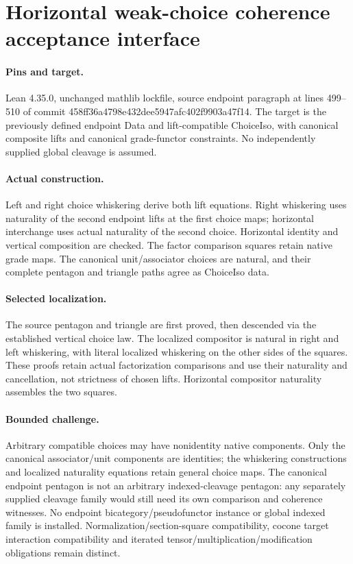 \documentclass{article}
\begin{document}
\section*{Horizontal weak-choice coherence acceptance interface}
\paragraph{Pins and target.} Lean 4.35.0, unchanged mathlib lockfile, source endpoint paragraph at lines 499--510 of commit 458ff36a4798e432dee5947afc402f9903a47f14. The target is the previously defined endpoint Data and lift-compatible ChoiceIso, with canonical composite lifts and canonical grade-functor constraints. No independently supplied global cleavage is assumed.
\paragraph{Actual construction.} Left and right choice whiskering derive both lift equations. Right whiskering uses naturality of the second endpoint lifts at the first choice maps; horizontal interchange uses actual naturality of the second choice. Horizontal identity and vertical composition are checked. The factor comparison squares retain native grade maps. The canonical unit/associator choices are natural, and their complete pentagon and triangle paths agree as ChoiceIso data.
\paragraph{Selected localization.} The source pentagon and triangle are first proved, then descended via the established vertical choice law. The localized compositor is natural in right and left whiskering, with literal localized whiskering on the other sides of the squares. These proofs retain actual factorization comparisons and use their naturality and cancellation, not strictness of chosen lifts. Horizontal compositor naturality assembles the two squares.
\paragraph{Bounded challenge.} Arbitrary compatible choices may have nonidentity native components. Only the canonical associator/unit components are identities; the whiskering constructions and localized naturality equations retain general choice maps. The canonical endpoint pentagon is not an arbitrary indexed-cleavage pentagon: any separately supplied cleavage family would still need its own comparison and coherence witnesses. No endpoint bicategory/pseudofunctor instance or global indexed family is installed. Normalization/section-square compatibility, cocone target interaction compatibility and iterated tensor/multiplication/modification obligations remain distinct.
\end{document}
